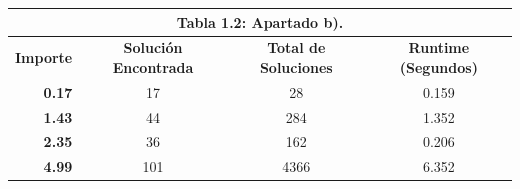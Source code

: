 \documentclass[12pt,letterpaper]{article}
\numberwithin{equation}{section} %
\numberwithin{figure}{section} %
\numberwithin{table}{section} %
\begin{document}
\begin{table}[H]
    \small
    \centering
\begin{tabular}{|rccc|}
\hline
\multicolumn{4}{|c|}{\textbf{Tabla 1.2: Apartado b).}}                                                                                                                                     \\ \hline
\multicolumn{1}{|c|}{\textbf{Importe}} & \multicolumn{1}{c|}{\textbf{Solución Encontrada}} & \multicolumn{1}{c|}{\textbf{Total de Soluciones}} & \textbf{Runtime (Segundos)} \\ \hline
\multicolumn{1}{|r|}{\textbf{0.17}}    & \multicolumn{1}{c|}{17}                                   & \multicolumn{1}{c|}{28}                                  & 0.159                       \\ \hline
\multicolumn{1}{|r|}{\textbf{1.43}}    & \multicolumn{1}{c|}{44}                                   & \multicolumn{1}{c|}{284}                                 & 1.352                       \\ \hline
\multicolumn{1}{|r|}{\textbf{2.35}}    & \multicolumn{1}{c|}{36}                                   & \multicolumn{1}{c|}{162}                                 & 0.206                       \\ \hline
\multicolumn{1}{|r|}{\textbf{4.99}}    & \multicolumn{1}{c|}{101}                                  & \multicolumn{1}{c|}{4366}                                & 6.352                       \\ \hline
\end{tabular}
\end{table}
\end{document}

